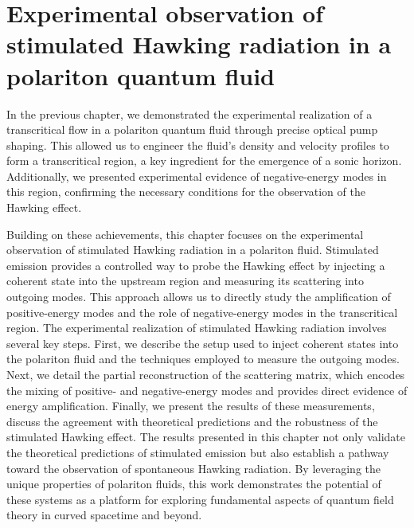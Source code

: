 \graphicspath{{./}{./fig/}{./chap_stimulated_hawking/fig/}}

\chapter{Experimental observation of stimulated Hawking radiation in a polariton quantum fluid}
\label{chap:stimulated_hawking}



In the previous chapter, we demonstrated the experimental realization of a transcritical flow in a polariton quantum fluid through precise optical pump shaping. This allowed us to engineer the fluid's density and velocity profiles to form a transcritical region, a key ingredient for the emergence of a sonic horizon. Additionally, we presented experimental evidence of negative-energy modes in this region, confirming the necessary conditions for the observation of the Hawking effect.

Building on these achievements, this chapter focuses on the experimental observation of stimulated Hawking radiation in a polariton fluid. Stimulated emission provides a controlled way to probe the Hawking effect by injecting a coherent state into the upstream region and measuring its scattering into outgoing modes. This approach allows us to directly study the amplification of positive-energy modes and the role of negative-energy modes in the transcritical region.
The experimental realization of stimulated Hawking radiation involves several key steps. First, we describe the setup used to inject coherent states into the polariton fluid and the techniques employed to measure the outgoing modes. 
Next, we detail the partial reconstruction of the scattering matrix, which encodes the mixing of positive- and negative-energy modes and provides direct evidence of energy amplification.
 Finally, we present the results of these measurements, discuss the agreement with theoretical predictions and the robustness of the stimulated Hawking effect.
The results presented in this chapter not only validate the theoretical predictions of stimulated emission but also establish a pathway toward the observation of spontaneous Hawking radiation. By leveraging the unique properties of polariton fluids, this work demonstrates the potential of these systems as a platform for exploring fundamental aspects of quantum field theory in curved spacetime and beyond.





